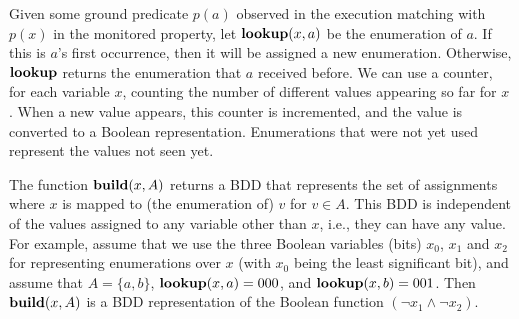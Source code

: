 

Given some ground predicate $p ( a )$ observed in the execution 
matching with $p ( x )$ in the monitored property,
let $\mathbf{lookup} ( x, a )$ be the enumeration of $a$. If this
is $a$'s first occurrence, then it will be assigned a new enumeration.
Otherwise, $\mathbf{lookup}$ returns the enumeration that $a$ received before. We can use a counter, for each variable $x$, counting the number of different values appearing so far for $x$. When a new value appears, this counter is incremented, and the value is converted to
a Boolean representation. Enumerations that were not yet used represent
the values not seen yet. 


The function $\mathbf{build} (x, A)$ returns
a BDD that represents the set of assignments where $x$ is mapped to 
(the enumeration of) $v$ for
$v \in A$. This BDD is independent
of the values assigned to any variable
other than $x$, i.e., they can have any value.
For example, assume that we use the three Boolean variables (bits) $x_0$, $x_1$ and $x_2$
for representing enumerations over $x$ (with $x_0$ being the least significant bit), and
assume that $A = \{ a , b \}$, 
$\mathbf{lookup} ( x, a ) = 000$, and $\mathbf{lookup} ( x , b ) = 001$.
Then $\mathbf{build} ( x , A )$ is a BDD representation of the Boolean function 
$(\neg x_1 \wedge \neg x_2)$. 

